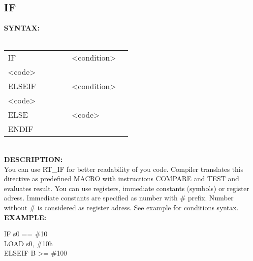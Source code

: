 {                \subsection{IF}
                    \textbf{SYNTAX:}\\
                    \\ {
                        \texttt{}
                            \begin{tabular}[h!]{llll}
                                { \color{highlight_directive} IF } & \verb'     ' &
                                { \color{highlight_constant} <condition> }\\
                                { \color{highlight_symbol} <code> }\\
                                { \color{highlight_directive} ELSEIF } & \verb'     ' &
                                { \color{highlight_constant} <condition> }\\
                                { \color{highlight_symbol} <code> }\\
                                { \color{highlight_directive} ELSE } & \verb'     ' &
                                { \color{highlight_symbol} <code> }\\
                                { \color{highlight_directive} ENDIF }
                            \end{tabular}
                        }\\
                    \textbf{DESCRIPTION:}\\
                    You can use RT\_IF for better readability of you code. Compiler translates this directive as predefined MACRO with instructions COMPARE and TEST and
                    evaluates result. You can use registers, immediate constants (symbols) or register adress. Immediate constants are specified as number with \# prefix.
                    Number without \# is considered as register adress. See example for conditions syntax.
                    \textbf{EXAMPLE:}\\
                            \begin{code}[h!]
                                    { \color{highlight_directive} IF }
                                    { \color{highlight_constant}   s0 == \#10 }\\
                                    { \color{highlight_instruction}   LOAD  s0, \#10h }\\
                                    { \color{highlight_comment}  ELSEIF} { \color{highlight_constant}   B >= \#100 }\\

\end{code}}
